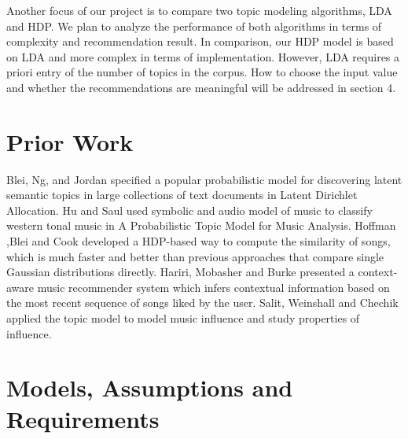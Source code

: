 \documentclass[10pt,twocolumn,letterpaper]{article}
\begin{document}
   \par
   Another focus of our project is to compare two topic modeling algorithms, LDA and HDP. We plan to analyze the performance of both algorithms in terms of complexity and recommendation result. In comparison, our HDP model is based on LDA and more complex in terms of implementation. However, LDA requires a priori entry of the number of topics in the corpus. How to choose the input value and whether the recommendations are meaningful will be addressed in section 4.


\section{Prior Work}
 Blei, Ng, and Jordan specified a popular probabilistic model for discovering latent semantic topics in large collections of text documents in Latent Dirichlet Allocation\cite{lda}. Hu and Saul used symbolic and audio model of music to classify western tonal music in A Probabilistic Topic Model for Music Analysis\cite{ptm}. Hoffman ,Blei and Cook developed a HDP-based way to compute the similarity of songs, which is much faster and better than previous approaches that compare single Gaussian distributions directly\cite{hdp}. Hariri, Mobasher and Burke presented a context-aware music recommender system which infers contextual information based on the most recent sequence of songs liked by the user\cite{context}. Salit, Weinshall and Chechik applied the topic model to model music influence and study properties of influence\cite{influence}. 
\section{Models, Assumptions and Requirements}
\end{document}
